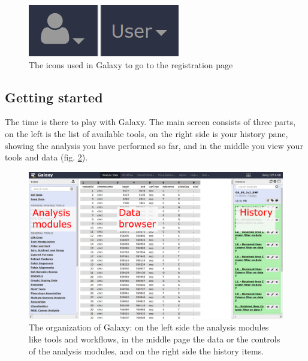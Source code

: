 \documentclass[11pt,a4paper]{article}
\begin{document}
\begin{figure}
 \center
  \includegraphics[scale=0.6]{figures/register_icon_1}
  \caption{\small{ The icons used in Galaxy to go to the registration page }}
  \label{fig:registration}
\end{figure}

\subsection*{Getting started}
The time is there to play with Galaxy. The main screen consists of three parts, on the left is the list of available tools, on the right side
is your history pane, showing the analysis you have performed so far, and in the middle you view your tools and data (fig. \ref{fig:organization_layout}).

\begin{figure}
 \center
  \includegraphics[width=\textwidth]{figures/galaxy_layout}
  \caption{\small{ The organization of Galaxy: on the left side the analysis modules like tools and workflows, in the middle page the data or the controls of the analysis modules, and on the right side the history items. }}
  \label{fig:organization_layout}
\end{figure}
\end{document}

